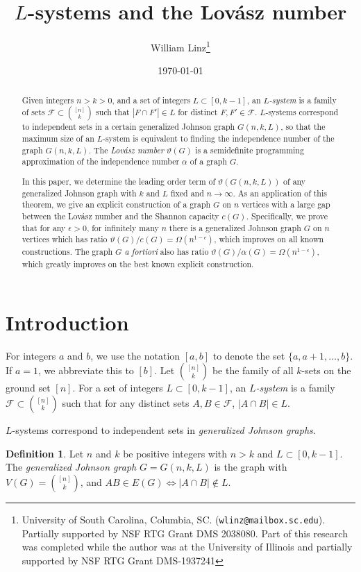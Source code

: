 \documentclass[11pt]{article}
\title{$L$-systems and the Lov\'asz number}
\author{William Linz\thanks{University of South Carolina, Columbia, SC. ({\tt wlinz@mailbox.sc.edu}). Partially supported by NSF RTG Grant DMS 2038080. Part of this research was completed while the author was at the University of Illinois and partially supported by NSF RTG Grant DMS-1937241}}
\date{\today}
\theoremstyle{definition}
\newtheorem{definition}[theorem]{Definition}
\theoremstyle{remark}
\newcommand{\cF}{\mathcal{F}}
\begin{document}
\maketitle

\begin{abstract}
Given integers $n > k > 0$, and a set of integers $L \subset [0, k-1]$, an \emph{$L$-system} is a family of sets $\cF \subset \binom{[n]}{k}$ such that $|F \cap F'| \in L$ for distinct $F, F'\in \cF$. $L$-systems correspond to independent sets in a certain generalized Johnson graph $G(n, k, L)$, so that the maximum size of an $L$-system is equivalent to finding the independence number of the graph $G(n, k, L)$. The \emph{Lov\'asz number} $\vartheta(G)$ is a semidefinite programming approximation of the independence number $\alpha$ of a graph $G$. 

In this paper, we determine the leading order term of $\vartheta(G(n, k, L))$ of any generalized Johnson graph with $k$ and $L$ fixed and $n\rightarrow \infty$. As an application of this theorem, we give an explicit construction of a graph $G$ on $n$ vertices with a large gap between the Lov\'asz number and the Shannon capacity $c(G)$. Specifically, we prove that for any $\epsilon > 0$, for infinitely many $n$ there is a generalized Johnson graph $G$ on $n$ vertices which has ratio $\vartheta(G)/c(G) = \Omega(n^{1-\epsilon})$, which improves on all known constructions. The graph $G$ \textit{a fortiori} also has ratio $\vartheta(G)/\alpha(G) = \Omega(n^{1-\epsilon})$, which greatly improves on the best known explicit construction.  
\end{abstract}

\section{Introduction}
For integers $a$ and $b$, we use the notation $[a, b]$ to denote the set $\{a, a+1, \ldots, b\}$. If $a=1$, we abbreviate this to $[b]$. Let $\binom{[n]}{k}$ be the family of all $k$-sets on the ground set $[n]$. For a set of integers $L \subset [0, k-1]$, an \emph{$L$-system} is a family $\cF \subset \binom{[n]}{k}$ such that for any distinct sets $A, B\in \cF$, $|A\cap B| \in L$. 
  
$L$-systems correspond to independent sets in \emph{generalized Johnson graphs}.

\begin{definition}\label{defn:johnsongraph}
Let $n$ and $k$ be positive integers with $n > k$ and $L\subset [0, k-1]$. The \emph{generalized Johnson graph} $G = G(n, k, L)$ is the graph with $V(G) = \binom{[n]}{k}$, and $AB \in E(G) \iff |A\cap B| \notin L$.

\end{definition} 
\end{document}
